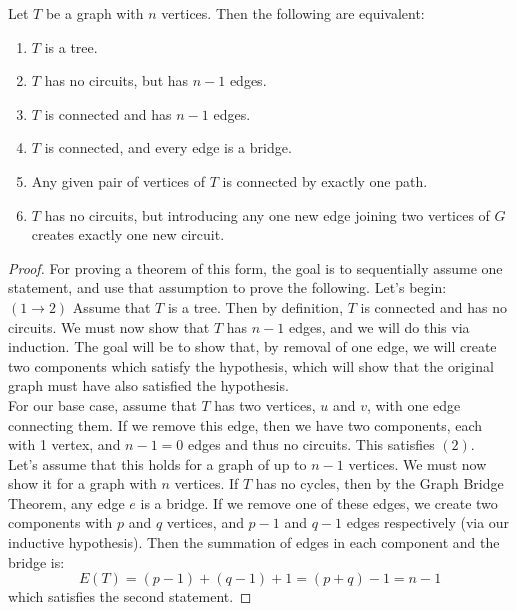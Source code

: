 \begin{theorem}
	Let $T$ be a graph with $n$ vertices. Then the following are equivalent:
	\begin{enumerate}
		\item $T$ is a tree.
		\item $T$ has no circuits, but has $n-1$ edges.
		\item $T$ is connected and has $n-1$ edges.
		\item $T$ is connected, and every edge is a bridge.
		\item Any given pair of vertices of $T$ is connected by exactly one path.
		\item $T$ has no circuits, but introducing any one new edge joining two vertices of $G$ creates exactly one new circuit.
	\end{enumerate}
\end{theorem}
\begin{proof}
	For proving a theorem of this form, the goal is to sequentially assume one statement, and use that assumption to prove the following. Let's begin: \\
	$(1 \rightarrow 2)$ Assume that $T$ is a tree. Then by definition, $T$ is connected and has no circuits. We must now show that $T$ has $n-1$ edges, and we will do this via induction. The goal will be to show that, by removal of one edge, we will create two components which satisfy the hypothesis, which will show that the original graph must have also satisfied the hypothesis. \\
	For our base case, assume that $T$ has two vertices, $u$ and $v$, with one edge connecting them. If we remove this edge, then we have two components, each with 1 vertex, and $n-1=0$ edges and thus no circuits. This satisfies $(2)$. \\
	Let's assume that this holds for a graph of up to $n-1$ vertices. We must now show it for a graph with $n$ vertices. If $T$ has no cycles, then by the Graph Bridge Theorem, any edge $e$ is a bridge. If we remove one of these edges, we create two components with $p$ and $q$ vertices, and $p-1$ and $q-1$ edges respectively (via our inductive hypothesis). Then the summation of edges in each component and the bridge is:
	\begin{equation*}
		E(T) = (p-1)+(q-1)+1 = (p+q)-1 = n-1
	\end{equation*}
	which satisfies the second statement.
\end{proof}



